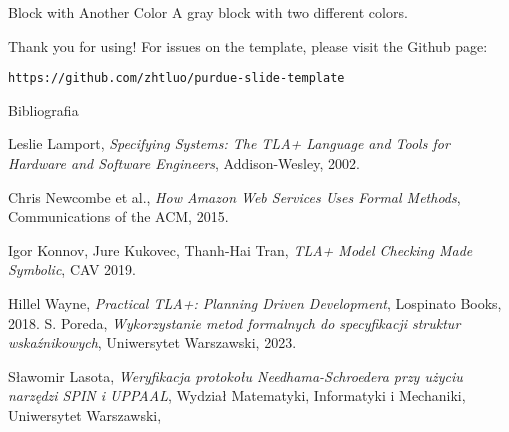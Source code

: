 \documentclass{purdue-poster}
\begin{document}
\begin{frame}{}
\begin{columns}[c]
\begin{column}{.48\linewidth}
    \begin{exampleblock}{Block with Another Color}
    A gray block with two different colors.
    \end{exampleblock}


    

    \begin{block}{Thank you for using!}
        For issues on the template, please visit the Github page:
        
        {\small\texttt{https://github.com/zhtluo/purdue-slide-template}\par}
    \end{block}

    \begin{block}{\large Bibliografia}
        {\scriptsize 
        \begin{thebibliography}{00}
            Leslie Lamport, \emph{Specifying Systems: The TLA+ Language and Tools for Hardware and Software Engineers}, Addison-Wesley, 2002.
          
            Chris Newcombe et al., \emph{How Amazon Web Services Uses Formal Methods}, Communications of the ACM, 2015.
          
            Igor Konnov, Jure Kukovec, Thanh-Hai Tran, \emph{TLA+ Model Checking Made Symbolic}, CAV 2019.
          
            Hillel Wayne, \emph{Practical TLA+: Planning Driven Development}, Lospinato Books, 2018.
            S. Poreda,
            \textit{Wykorzystanie metod formalnych do specyfikacji struktur wskaźnikowych},
            Uniwersytet Warszawski, 2023.
        
            Sławomir Lasota,
            \textit{Weryfikacja protokołu Needhama-Schroedera przy użyciu narzędzi SPIN i UPPAAL},
            Wydział Matematyki, Informatyki i Mechaniki, Uniwersytet Warszawski,
        

\end{thebibliography}}
\end{block}
\end{column}
\end{columns}
\end{frame}
\end{document}
